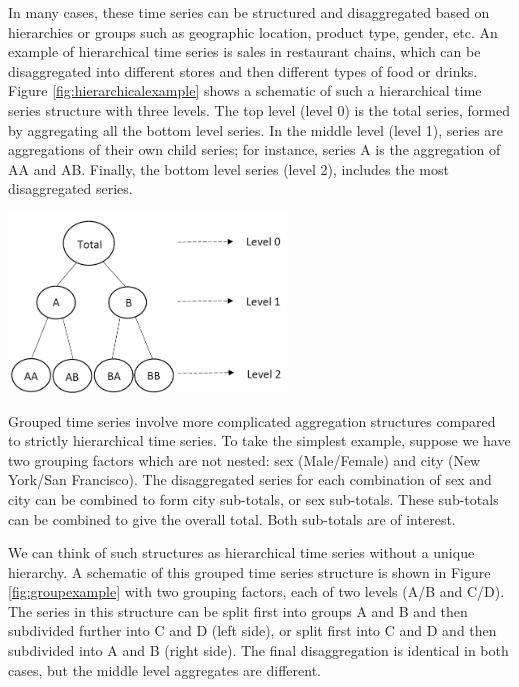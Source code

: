 \documentclass[11pt,a4paper,]{article}
\let\origfigure\figure
\let\endorigfigure\endfigure
\renewenvironment{figure}[1][2] {
    \expandafter\origfigure\expandafter[htbp]
} {
    \endorigfigure
}
\begin{document}
In many cases, these time series can be structured and disaggregated based on hierarchies or groups such as geographic location, product type, gender, etc. An example of hierarchical time series is sales in restaurant chains, which can be disaggregated into different stores and then different types of food or drinks. Figure \ref{fig:hierarchicalexample} shows a schematic of such a hierarchical time series structure with three levels. The top level (level 0) is the total series, formed by aggregating all the bottom level series. In the middle level (level 1), series are aggregations of their own child series; for instance, series A is the aggregation of AA and AB. Finally, the bottom level series (level 2), includes the most disaggregated series.

\begin{figure}

{\centering \includegraphics[width=280px,height=180px]{Paper-Figures/hierarchical_example} 

}

\caption{An example of a two level hierarchy structure}\label{fig:hierarchicalexample}
\end{figure}

Grouped time series involve more complicated aggregation structures compared to strictly hierarchical time series. To take the simplest example, suppose we have two grouping factors which are not nested: sex (Male/Female) and city (New York/San Francisco). The disaggregated series for each combination of sex and city can be combined to form city sub-totals, or sex sub-totals. These sub-totals can be combined to give the overall total. Both sub-totals are of interest.

We can think of such structures as hierarchical time series without a unique hierarchy. A schematic of this grouped time series structure is shown in Figure \ref{fig:groupexample} with two grouping factors, each of two levels (A/B and C/D). The series in this structure can be split first into groups A and B and then subdivided further into C and D (left side), or split first into C and D and then subdivided into A and B (right side). The final disaggregation is identical in both cases, but the middle level aggregates are different.
\end{document}
